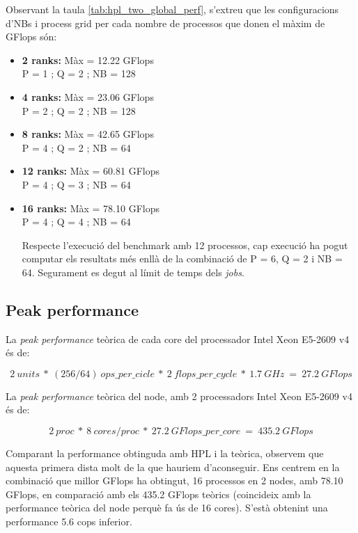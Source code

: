 Observant la taula \ref{tab:hpl_two_global_perf}, s'extreu que les configuracions d'NBs i process grid per cada nombre de processos que donen el màxim de GFlops són:
\begin{itemize}
    \item \textbf{2 ranks: } Màx = 12.22 GFlops  \\ P = 1  ; Q = 2  ; NB = 128
    \item \textbf{4 ranks: } Màx = 23.06 GFlops  \\ P = 2  ; Q = 2  ; NB = 128
    \item \textbf{8 ranks: } Màx = 42.65 GFlops  \\ P = 4  ; Q = 2  ; NB = 64
    \item \textbf{12 ranks:} Màx = 60.81 GFlops  \\ P = 4  ; Q = 3  ; NB = 64
    \item \textbf{16 ranks:} Màx = 78.10 GFlops  \\ P = 4  ; Q = 4  ; NB = 64

        Respecte l'execució del benchmark amb 12 processos, cap execució ha pogut computar els resultats més enllà de la combinació de P = 6, Q = 2 i NB = 64. Segurament es degut al límit de temps dels \textit{jobs}.

\end{itemize}


\subsection{Peak performance}
La \textit{peak performance} teòrica de cada core del processador Intel Xeon E5-2609 v4 és de:

\[2\ units\ *\ (256/64)\ ops\_per\_cicle\ *\ 2\ flops\_per\_cycle\ *\ 1.7\ GHz\ =\ 27.2\ GFlops\]

La \textit{peak performance} teòrica del node, amb 2 processadors Intel Xeon E5-2609 v4 és de:

\[2\ proc\ *\ 8\ cores/proc\ *\ 27.2\ GFlops\_per\_core\ =\ 435.2\ GFlops\]

Comparant la performance obtinguda amb HPL i la teòrica, observem que aquesta primera dista molt de la que hauriem d'aconseguir. Ens centrem en la combinació que millor GFlops ha obtingut, 16 processos en 2 nodes, amb 78.10 GFlops, en comparació amb els 435.2 GFlops teòrics (coincideix amb la performance teòrica del node perquè fa ús de 16 cores). 
S'està obtenint una performance 5.6 cops inferior.

